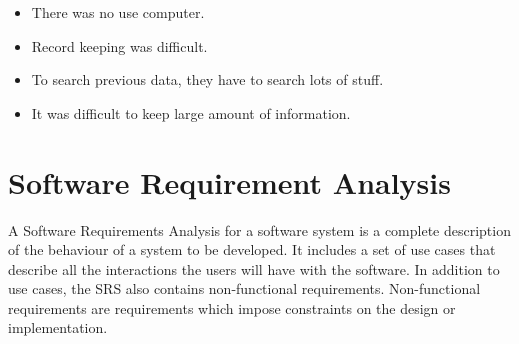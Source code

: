 \begin{itemize}
\item There was no use computer.

\item Record keeping was difficult.

\item To search previous data, they have to search lots of stuff.

\item It was difficult to keep large amount of information.

\end{itemize}


\section{Software Requirement Analysis}
A Software Requirements Analysis for a software system is a complete 
description of the behaviour of a system to be developed. It includes 
a set of use cases that describe all the interactions the users will 
have with the software. In addition to use cases, the SRS also contains 
non-functional requirements. Non-functional requirements are 
requirements which impose constraints on the design or implementation.
